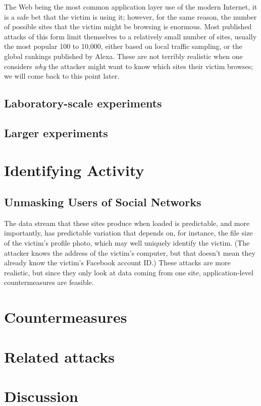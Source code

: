 \documentclass{zarticle}
\begin{document}
The Web being the most common application layer use of the modern
Internet, it is a safe bet that the victim is using it; however, for
the same reason, the number of possible sites that the victim might be
browsing is enormous.  Most published attacks of this form limit
themselves to a relatively small number of sites, usually the most
popular 100 to 10,000, either based on local traffic sampling, or the
global rankings published by Alexa.  These are not terribly realistic
when one considers \emph{why} the attacker might want to know which
sites their victim browses; we will come back to this point later.

\subsection{Laboratory-scale experiments}

\subsection{Larger experiments}

\section{Identifying Activity}

\subsection{Unmasking Users of Social Networks}

The data stream that these sites produce when loaded is predictable,
and more importantly, has predictable variation that depends on, for
instance, the file size of the victim's profile photo, which may well
uniquely identify the victim.  (The attacker knows the address of the
victim's computer, but that doesn't mean they already know the
victim's Facebook account ID.)  These attacks are more realistic, but
since they only look at data coming from one site, application-level
countermeasures are feasible.

\section{Countermeasures}

\section{Related attacks}

\section{Discussion}

\printbibliography
\end{document}
